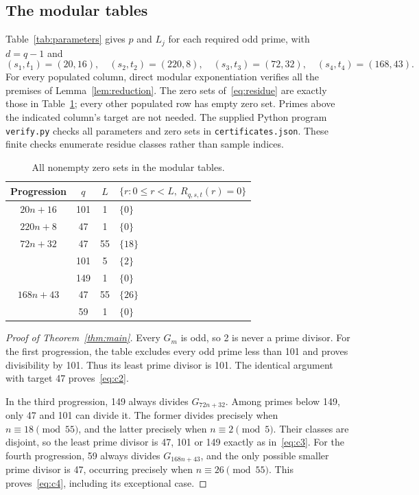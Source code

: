 \documentclass[11pt]{article}
\begin{document}
\subsection*{The modular tables}
Table~\ref{tab:parameters} gives $p$ and $L_j$ for each required odd prime,
with $d=q-1$ and
\[
 (s_1,t_1)=(20,16),\quad(s_2,t_2)=(220,8),\quad
 (s_3,t_3)=(72,32),\quad(s_4,t_4)=(168,43).
\]
For every populated column, direct modular exponentiation verifies all the
premises of Lemma~\ref{lem:reduction}. The zero sets of~\eqref{eq:residue}
are exactly those in Table~\ref{tab:zeros}; every other populated row has
empty zero set. Primes above the indicated column's target are not needed.
The supplied Python program \texttt{verify.py} checks all parameters and zero
sets in \texttt{certificates.json}. These finite checks enumerate residue
classes rather than sample indices.

\begin{table}[ht]
\centering
\begin{tabular}{cccl}
\toprule
Progression & $q$ & $L$ & $\{r:0\leq r<L,\ R_{q,s,t}(r)=0\}$\\
\midrule
$20n+16$ &101&1&$\{0\}$\\
$220n+8$ &47&1&$\{0\}$\\
$72n+32$ &47&55&$\{18\}$\\
           &101&5&$\{2\}$\\
           &149&1&$\{0\}$\\
$168n+43$ &47&55&$\{26\}$\\
            &59&1&$\{0\}$\\
\bottomrule
\end{tabular}
\caption{All nonempty zero sets in the modular tables.}\label{tab:zeros}
\end{table}

\begin{proof}[Proof of Theorem~\ref{thm:main}]
Every $G_m$ is odd, so 2 is never a prime divisor.
For the first progression, the table excludes every odd prime less than 101
and proves divisibility by 101. Thus its least prime divisor is 101.
The identical argument with target 47 proves~\eqref{eq:c2}.

In the third progression, 149 always divides $G_{72n+32}$.
Among primes below 149, only 47 and 101 can divide it.
The former divides precisely when $n\equiv18\pmod{55}$, and the latter
precisely when $n\equiv2\pmod5$. Their classes are disjoint, so the least
prime divisor is 47, 101 or 149 exactly as in~\eqref{eq:c3}.
For the fourth progression, 59 always divides $G_{168n+43}$, and the only
possible smaller prime divisor is 47, occurring precisely when
$n\equiv26\pmod{55}$. This proves~\eqref{eq:c4}, including its exceptional case.
\end{proof}
\end{document}
